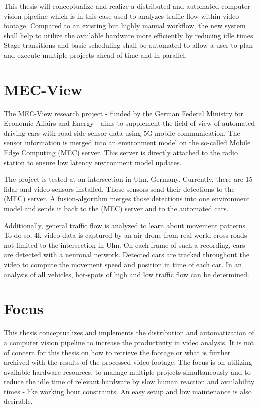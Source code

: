 This thesis will conceptualize and realize a distributed and automated computer vision pipeline which is in this case used to analyzes traffic flow within video footage.
Compared to an existing but highly manual workflow, the new system shall help to utilize the available hardware more efficiently by reducing idle times.
Stage transitions and basic scheduling shall be automated to allow a user to plan and execute multiple projects ahead of time and in parallel.



\newpage
\section{MEC-View}


The MEC-View research project\cite{mecview:main} - funded by the German Federal Ministry for Economic Affairs and Energy - aims to supplement the field of view of automated driving cars with road-side sensor data using 5G mobile communication. The sensor information is merged into an environment model on the so-called Mobile Edge Computing (MEC) server. This server is directly attached to the radio station to ensure low latency environment model updates.

The project is tested at an intersection in Ulm, Germany.
Currently, there are 15 lidar and video sensors installed.
Those sensors send their detections to the (MEC) server.
A fusion-algorithm merges those detections into one environment model and sends it back to the (MEC) server and to the automated cars.

Additionally, general traffic flow is analyzed to learn about movement patterns.
To do so, 4k video data is captured by an air drone from real world cross roads - not limited to the intersection in Ulm.
On each frame of such a recording, cars are detected with a neuronal network.
Detected cars are tracked throughout the video to compute the movement speed and position in time of each car.
In an analysis of all vehicles, hot-spots of high and low traffic flow can be determined.

\section{Focus}

This thesis conceptualizes and implements the distribution and automatization of a computer vision pipeline to increase the productivity in video analysis.
It is not of concern for this thesis on how to retrieve the footage or what is further archived with the results of the processed video footage.
The focus is on utilizing available hardware resources, to manage multiple projects simultaneously and to reduce the idle time of relevant hardware by slow human reaction and availability times - like working hour constraints.
An easy setup and low maintenance is also desirable.

